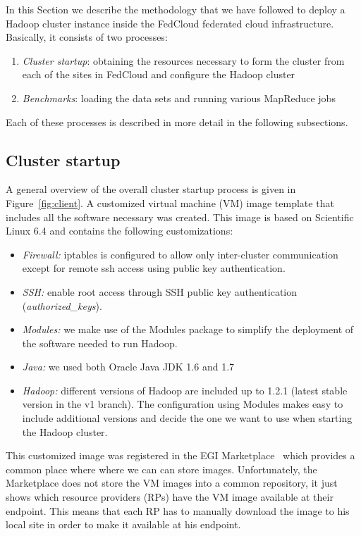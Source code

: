 In this Section we describe the methodology that we have followed to deploy a Hadoop cluster instance inside the FedCloud federated cloud infrastructure. Basically, it consists of two processes: 
\begin{enumerate}
\item \emph{Cluster startup}: obtaining the resources necessary to form the cluster from each of the sites in FedCloud and configure the Hadoop cluster
\item \emph{Benchmarks}: loading the data sets and running various MapReduce jobs
\end{enumerate}
Each of these processes is described in more detail in the following subsections.

\subsection{Cluster startup}
\label{ssect-cluster}

A general overview of the overall cluster startup process is given in Figure~\ref{fig:client}.
A customized virtual machine (VM) image template that includes all the software necessary was created. This image is based on Scientific Linux 6.4 and contains the following customizations:
\begin{itemize}
\item \emph{Firewall:} iptables is configured to allow only inter-cluster communication except for remote ssh access using public key authentication.
\item \emph{SSH:} enable root access through SSH public key authentication (\emph{authorized\_keys}).
\item \emph{Modules:} we make use of the Modules package to simplify the deployment of the software needed to run Hadoop.
\item \emph{Java:} we used both Oracle Java JDK 1.6 and 1.7
\item \emph{Hadoop:} different versions of Hadoop are included up to 1.2.1 (latest stable version in the v1 branch). The configuration using Modules makes easy to include additional versions and decide the one we want to use when starting the Hadoop cluster.
\end{itemize}


This customized image was registered in the EGI Marketplace~\cite{marketplace} which provides a common place where where we can can store images. Unfortunately, the Marketplace does not store the VM images into a common repository, it just shows which resource providers (RPs) have the VM image available at their endpoint. This means that each RP has to manually download the image to his local site in order to make it available at his endpoint. 

